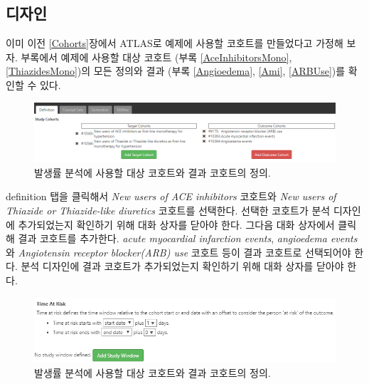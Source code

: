 \documentclass[10.5pt]{book}
\theoremstyle{definition}
\theoremstyle{definition}
\theoremstyle{definition}
\theoremstyle{remark}
\begin{document}
\subsection{디자인}\label{-1}

이미 이전 \ref{Cohorts}장에서 ATLAS로 예제에 사용할 코호트를 만들었다고
가정해 보자. 부록에서 예제에 사용할 대상 코호트 (부록
\ref{AceInhibitorsMono}, \ref{ThiazidesMono})의 모든 정의와 결과 (부록
\ref{Angioedema}, \ref{Ami}, \ref{ARBUse})를 확인할 수 있다.

\begin{figure}

{\centering \includegraphics[width=1\linewidth]{images/Characterization/atlasIncidenceCohortSelection} 

}

\caption{발생률 분석에 사용할 대상 코호트와 결과 코호트의 정의.}\label{fig:atlasIncidenceCohortSelection}
\end{figure}

definition 탭을 클릭해서 \emph{New users of ACE inhibitors} 코호트와
\emph{New users of Thiazide or Thiazide-like diuretics} 코호트를
선택한다. 선택한 코호트가 분석 디자인에 추가되었는지 확인하기 위해 대화
상자를 닫아야 한다. 그다음 대화 상자에서 클릭해 결과 코호트를 추가한다.
\emph{acute myocardial infarction events}, \emph{angioedema events}와
\emph{Angiotensin receptor blocker(ARB) use} 코호트 등이 결과 코호트로
선택되어야 한다. 분석 디자인에 결과 코호트가 추가되었는지 확인하기 위해
대화 상자를 닫아야 한다.

\begin{figure}

{\centering \includegraphics[width=1\linewidth]{images/Characterization/atlasIncidenceTimeAtRisk} 

}

\caption{발생률 분석에 사용할 대상 코호트와 결과 코호트의 정의.}\label{fig:atlasIncidenceTimeAtRisk}
\end{figure}
\end{document}
